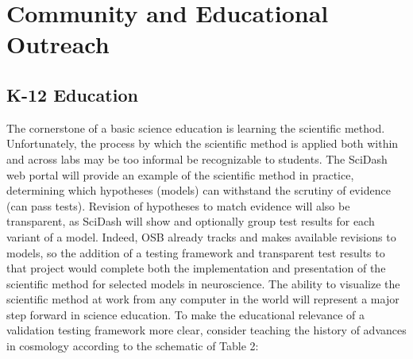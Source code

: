 \documentclass[11pt,letterpaper]{article}
\begin{document}
\section{Community and Educational Outreach}
\subsection{K-12 Education}
The cornerstone of a basic science education is learning the scientific method.  Unfortunately, the process by which the scientific method is applied both within and across labs may be too informal be recognizable to students.  The SciDash web portal will provide an example of the scientific method in practice, determining which hypotheses (models) can withstand the scrutiny of evidence (can pass tests).  Revision of hypotheses to match evidence will also be transparent, as SciDash will show and optionally group test results for each variant of a model.  Indeed, OSB already tracks and makes available revisions to models, so the addition of a testing framework and transparent test results to that project would complete both the implementation and presentation of the scientific method for selected models in neuroscience.  The ability to visualize the scientific method at work from any computer in the world will represent a major step forward in science education.  
To make the educational relevance of a validation testing framework more clear, consider teaching the history of advances in cosmology according 
to the schematic of Table 2:  
\end{document}
